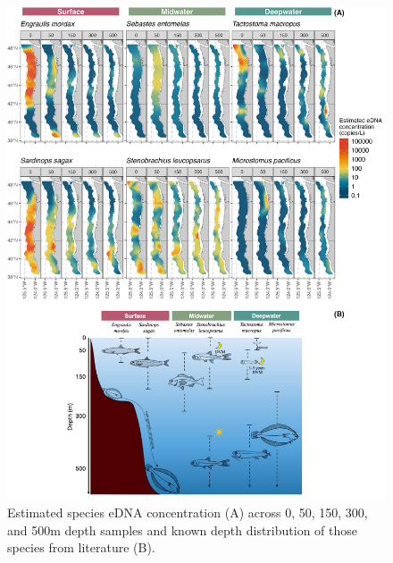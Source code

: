 \documentclass{article}
\begin{document}
\begin{figure}[tbhp]
\centering
\includegraphics[width=16cm]{plots/1_Figure_1.jpg}  %
\caption{Estimated species eDNA concentration (A) across 0, 50, 150, 300, and 500m depth samples and known depth distribution of those species from literature (B).}
\label{fig:fig1}
\end{figure}
\end{document}

